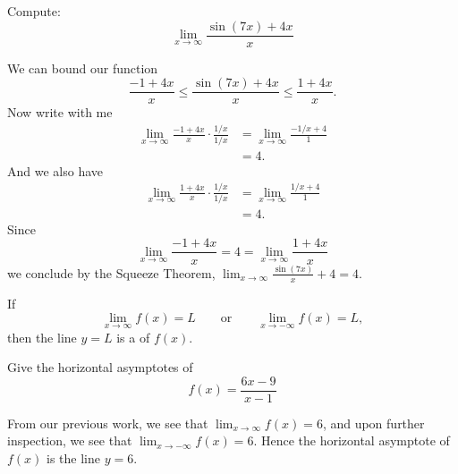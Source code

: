 \documentclass{ximera}
\begin{document}
\begin{example}
Compute:
\[
\lim_{x\to \infty} \frac{\sin(7x)+4x}{x}
\]
\begin{image}
\end{image}

\begin{explanation}
We can bound our function
\[
\frac{-1+4x}{x} \le \frac{\sin(7x)+4x}{x} \le \frac{1+4x}{x}.
\]
Now write with me
\begin{align*}
\lim_{x\to\infty}\frac{-1+4x}{x} \cdot \frac{1/x}{1/x} &= \lim_{x\to\infty}\frac{-1/x+4}{1}\\
&=4.
\end{align*}
And we also have
\begin{align*}
\lim_{x\to\infty}\frac{1+4x}{x} \cdot \frac{1/x}{1/x} &= \lim_{x\to\infty}\frac{1/x+4}{1}\\
&=4.
\end{align*}
Since 
\[
\lim_{x\to \infty} \frac{-1+4x}{x}  = 4 = \lim_{x\to \infty}\frac{1+4x}{x} 
\] 
we conclude by the Squeeze Theorem,
$\lim_{x\to\infty}\frac{\sin(7x)}{x}+4 = 4$.
\end{explanation}
\end{example}






\begin{definition}\label{def:horiz asymptote}
If  
\[
\lim_{x\to \infty} f(x) = L \qquad\text{or}\qquad \lim_{x\to -\infty} f(x) = L,
\]
then the line $y=L$ is a  of $f(x)$.
\end{definition}

\begin{example} 
Give the horizontal asymptotes of
\[
f(x) = \frac{6x-9}{x-1}
\]
\begin{explanation}
From our previous work, we see that $\lim_{x\to \infty} f(x) = 6$, and
upon further inspection, we see that $\lim_{x\to -\infty} f(x) =
6$. Hence the horizontal asymptote of $f(x)$ is the line $y=6$.
\end{explanation}
\end{example}
\end{document}
